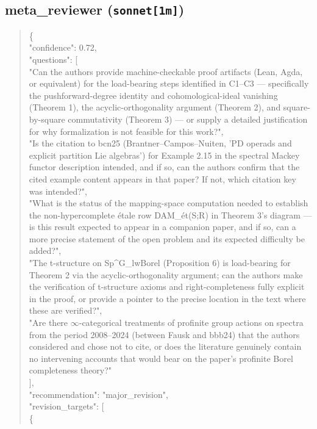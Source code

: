 \documentclass[11pt]{article}
\begin{document}
\subsection*{meta\_reviewer (\texttt{sonnet[1m]})}
\begin{quote}\small\ttfamily\raggedright
\{\\
  "confidence": 0.72,\\
  "questions": [\\
    "Can the authors provide machine-checkable proof artifacts (Lean, Agda, or equivalent) for the load-bearing steps identified in C1--C3 --- specifically the pushforward-degree identity and cohomological-ideal vanishing (Theorem 1), the acyclic-orthogonality argument (Theorem 2), and square-by-square commutativity (Theorem 3) --- or supply a detailed justification for why formalization is not feasible for this work?",\\
    "Is the citation to bcn25 (Brantner--Campos--Nuiten, 'PD operads and explicit partition Lie algebras') for Example 2.15 in the spectral Mackey functor description intended, and if so, can the authors confirm that the cited example content appears in that paper? If not, which citation key was intended?",\\
    "What is the status of the mapping-space computation needed to establish the non-hypercomplete étale row DAM\_ét(S;R) in Theorem 3's diagram --- is this result expected to appear in a companion paper, and if so, can a more precise statement of the open problem and its expected difficulty be added?",\\
    "The t-structure on Sp\^{}G\_lwBorel (Proposition 6) is load-bearing for Theorem 2 via the acyclic-orthogonality argument; can the authors make the verification of t-structure axioms and right-completeness fully explicit in the proof, or provide a pointer to the precise location in the text where these are verified?",\\
    "Are there \ensuremath{\infty}-categorical treatments of profinite group actions on spectra from the period 2008--2024 (between Fausk and bbb24) that the authors considered and chose not to cite, or does the literature genuinely contain no intervening accounts that would bear on the paper's profinite Borel completeness theory?"\\
  ],\\
  "recommendation": "major\_revision",\\
  "revision\_targets": [\\
    \{\\

\end{quote}
\end{document}
